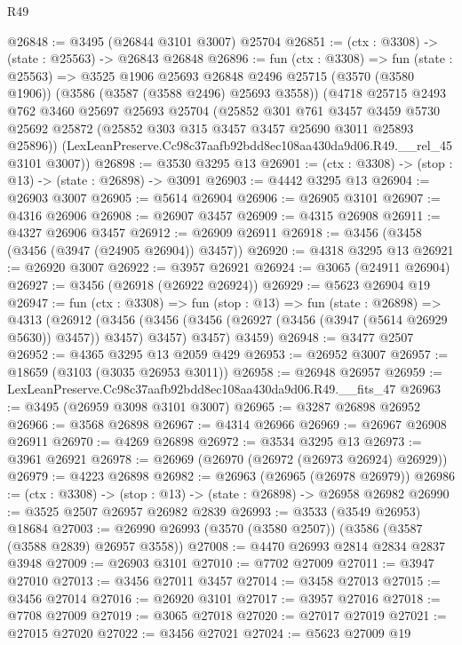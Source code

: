 \begin{lexlean}{R49}
\begin{coremodule}
@26848 := @3495 (@26844 @3101 @3007) @25704
@26851 := (ctx : @3308) -> (state : @25563) -> @26843 @26848
@26896 := fun (ctx : @3308) =>
  fun (state : @25563) =>
  @3525
    @1906
    @25693
    @26848
    @2496
    @25715
    (@3570 (@3580 @1906))
    (@3586 (@3587 (@3588 @2496) @25693 @3558))
    (@4718
      @25715
      @2493
      @762
      @3460
      @25697
      @25693
      @25704
      (@25852
        @301
        @761
        @3457
        @3459
        @5730
        @25692
        @25872
        (@25852 @303 @315 @3457 @3457 @25690 @3011 @25893 @25896))
      (LexLeanPreserve.Cc98c37aafb92bdd8ec108aa430da9d06.R49.__rel_45 @3101 @3007))
@26898 := @3530 @3295 @13
@26901 := (ctx : @3308) -> (stop : @13) -> (state : @26898) -> @3091
@26903 := @4442 @3295 @13
@26904 := @26903 @3007
@26905 := @5614 @26904
@26906 := @26905 @3101
@26907 := @4316 @26906
@26908 := @26907 @3457
@26909 := @4315 @26908
@26911 := @4327 @26906 @3457
@26912 := @26909 @26911
@26918 := @3456 (@3458 (@3456 (@3947 (@24905 @26904)) @3457))
@26920 := @4318 @3295 @13
@26921 := @26920 @3007
@26922 := @3957 @26921
@26924 := @3065 (@24911 @26904)
@26927 := @3456 (@26918 (@26922 @26924))
@26929 := @5623 @26904 @19
@26947 := fun (ctx : @3308) =>
  fun (stop : @13) =>
  fun (state : @26898) =>
  @4313
    (@26912
      (@3456 (@3456 (@3456 (@26927 (@3456 (@3947 (@5614 @26929 @5630)) @3457)) @3457) @3457) @3457)
      @3459)
@26948 := @3477 @2507
@26952 := @4365 @3295 @13 @2059 @429
@26953 := @26952 @3007
@26957 := @18659 (@3103 (@3035 @26953 @3011))
@26958 := @26948 @26957
@26959 := LexLeanPreserve.Cc98c37aafb92bdd8ec108aa430da9d06.R49.__fits_47
@26963 := @3495 (@26959 @3098 @3101 @3007)
@26965 := @3287 @26898 @26952
@26966 := @3568 @26898
@26967 := @4314 @26966
@26969 := @26967 @26908 @26911
@26970 := @4269 @26898
@26972 := @3534 @3295 @13
@26973 := @3961 @26921
@26978 := @26969 (@26970 (@26972 (@26973 @26924) @26929))
@26979 := @4223 @26898
@26982 := @26963 (@26965 (@26978 @26979))
@26986 := (ctx : @3308) -> (stop : @13) -> (state : @26898) -> @26958 @26982
@26990 := @3525 @2507 @26957 @26982 @2839
@26993 := @3533 (@3549 @26953) @18684
@27003 := @26990 @26993 (@3570 (@3580 @2507)) (@3586 (@3587 (@3588 @2839) @26957 @3558))
@27008 := @4470 @26993 @2814 @2834 @2837 @3948
@27009 := @26903 @3101
@27010 := @7702 @27009
@27011 := @3947 @27010
@27013 := @3456 @27011 @3457
@27014 := @3458 @27013
@27015 := @3456 @27014
@27016 := @26920 @3101
@27017 := @3957 @27016
@27018 := @7708 @27009
@27019 := @3065 @27018
@27020 := @27017 @27019
@27021 := @27015 @27020
@27022 := @3456 @27021
@27024 := @5623 @27009 @19

\end{coremodule}
\end{lexlean}
